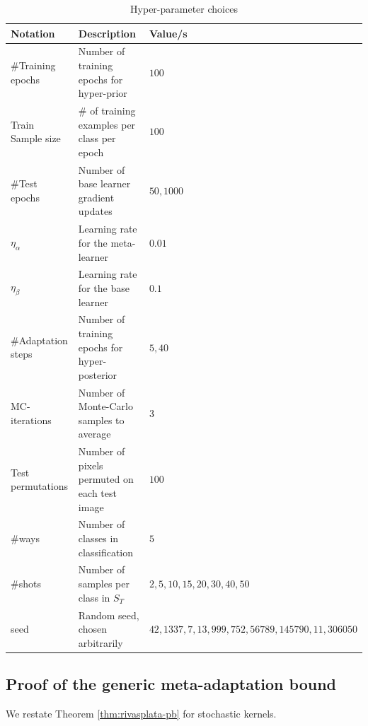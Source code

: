 \documentclass{article} %
\theoremstyle{definition}
\begin{document}
\begin{table}[ht]	
	
	\centering
	\begin{tabular}{lll}
		\toprule
		Notation   & Description  & Value/s   \\
		\midrule
		\#Training epochs & Number of training epochs for hyper-prior   & $100$      \\
		\midrule
		Train Sample size & \# of training examples per class per epoch   & $100$      \\
		\midrule
		\#Test epochs & Number of base learner gradient updates   & $50,1000$      \\
		\midrule
		$\eta_{\alpha}$  & Learning rate for the meta-learner   & $0.01$      \\
		\midrule
		$\eta_{\beta}$  & Learning rate for the base learner   & $0.1$      \\
		\midrule
		\#Adaptation steps  & Number of training epochs for hyper-posterior   & $5,40$      \\
		\midrule
		MC-iterations & Number of Monte-Carlo samples to average & $3$\\
		\midrule
		Test permutations  & Number of pixels permuted on each test image   & $100$      \\
		\midrule
		\#ways & Number of classes in classification & $5$\\
		\midrule
		\#shots & Number of samples per class in $S_T$ & $2,5,10,15,20,30,40,50$\\
		\midrule
		seed & Random seed, chosen arbitrarily & $42,1337,7,13,999,752,56789,145790,11,306050$\\
		\bottomrule
	\end{tabular}
	\caption{Hyper-parameter choices}
	\label{table:hyper-params}
\end{table}

\subsection{Proof of the generic meta-adaptation bound} \label{append:proof-main-result}

We restate Theorem \ref{thm:rivasplata-pb} for stochastic kernels. 
\end{document}
